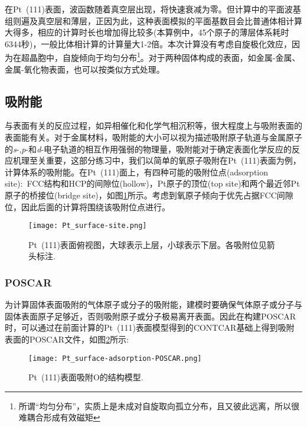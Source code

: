在\textrm{Pt~(111)}表面，波函数随着真空层出现，将快速衰减为零。但计算中的平面波基组则遍及真空层和薄层，正因为此，这种表面模拟的平面基数目会比普通体相计算大得多，相应的计算时长也增加得比较多(本算例中，45个原子的薄层体系耗时6344秒)，一般比体相计算的计算量大1-2倍。本次计算没有考虑自旋极化效应，因为在超晶胞中，自旋倾向于均匀分布\footnote{所谓“均匀分布”，实质上是未成对自旋取向孤立分布，且又彼此远离，所以很难耦合形成有效磁矩}。对于两种固体构成的表面，如金属-金属、金属-氧化物表面，也可以按类似方式处理。

\subsection{吸附能}
与表面有关的反应过程，如异相催化和化学气相沉积等，很大程度上与吸附表面的表面能有关。对于金属材料，吸附能的大小可以视为描述吸附原子轨道与金属原子的\textit{s}-,\textit{p}-和\textit{d}-电子轨道的相互作用强弱的物理量，吸附能对于确定表面化学反应的反应机理至关重要，这部分练习中，我们以简单的氧原子吸附在\textrm{Pt~(111)}表面为例，计算体系的吸附能。在\textrm{Pt~(111)}面上，有四种可能的吸附位点\textrm{(adsorption site)}:~\textrm{FCC}结构和\textrm{HCP}的间隙位\textrm{(hollow)}，\textrm{Pt}原子的顶位\textrm{(top site)}和两个最近邻\textrm{Pt}原子的桥接位\textrm{(bridge site)}，如图\ref{Pt_surface-site}所示。考虑到氧原子倾向于优先占据\textrm{FCC}间隙位，因此后面的计算将围绕该吸附位点进行。
\begin{figure}[h!]
\centering
\texttt{[image: Pt\_surface-site.png]}
\caption{\small \textrm{Pt~(111)表面俯视图，大球表示上层，小球表示下层。各吸附位见箭头标注.}}%
\label{Pt_surface-site}
\end{figure}

\subsubsection{\rm{POSCAR}}
为计算固体表面吸附的气体原子或分子的吸附能，建模时要确保气体原子或分子与固体表面原子足够近，否则吸附原子或分子极易离开表面。因此在构建\textrm{POSCAR}时，可以通过在前面计算的\textrm{Pt~(111)}表面模型得到的\textrm{CONTCAR}基础上得到吸附表面的\textrm{POSCAR}文件，如图\ref{Pt_surface-adsorption-POSCAR}所示:~
\begin{figure}[h!]
\centering
\texttt{[image: Pt\_surface-adsorption-POSCAR.png]}
\caption{\small \textrm{\textrm{Pt~(111)}表面吸附\textrm{O}的结构模型.}}%
\label{Pt_surface-adsorption-POSCAR}
\end{figure}

